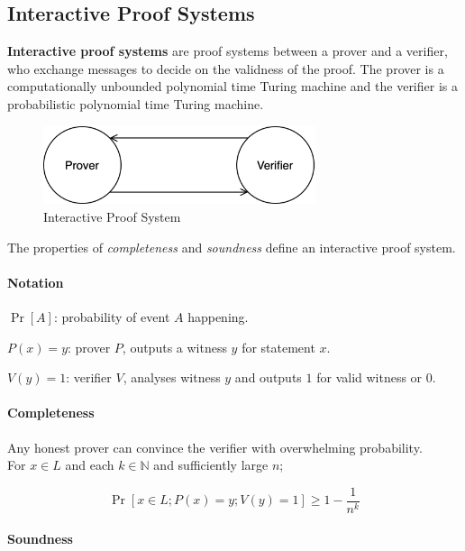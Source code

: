 \subsection{Interactive Proof Systems}
\textbf{Interactive proof systems} are proof systems between a prover and a verifier, who exchange messages to decide on the validness of the proof.
The prover is a computationally unbounded polynomial time Turing machine and the verifier is a probabilistic polynomial time Turing machine.

\begin{figure}[h]
	\centering
	\includegraphics[width=8cm]{images/interactive-proof-system}
	\caption{Interactive Proof System}
	\label{fig:interactive-proof-system}
\end{figure}


The properties of \textit{completeness} and \textit{soundness} define an interactive proof system.

\paragraph{Notation}
\begin{description}
	\item $\Pr[A]$: probability of event $A$ happening.
	\item $P(x) = y$: prover $P$, outputs a witness $y$ for statement $x$.
	\item $V(y) = 1$: verifier $V$, analyses witness $y$ and outputs $1$ for valid witness or $0$.
\end{description}

\paragraph{Completeness}

Any honest prover can convince the verifier with overwhelming probability.\\
For $x \in L$ and each $k \in \mathbb{N}$ and sufficiently large $n$;

$$\Pr[x \in L; P(x) = y; V(y) = 1] \ge 1 - \frac{1}{n^k}$$

\paragraph{Soundness}

